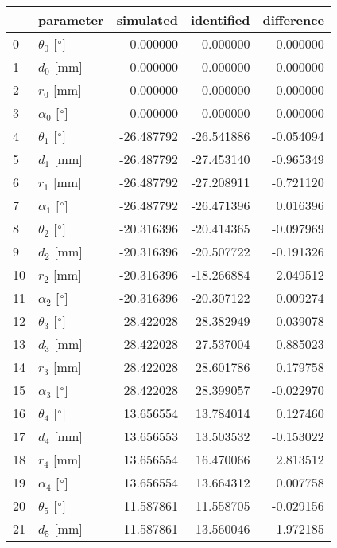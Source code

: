 \documentclass{standalone}%
\begin{document}
%
\normalsize%
\begin{tabular}{llrrr}
\toprule
{} &                 parameter &  simulated & identified & difference \\
\midrule
0  &  $\theta_{0}$ [$\degree$] &   0.000000 &   0.000000 &   0.000000 \\
1  &              $d_{0}$ [mm] &   0.000000 &   0.000000 &   0.000000 \\
2  &              $r_{0}$ [mm] &   0.000000 &   0.000000 &   0.000000 \\
3  &  $\alpha_{0}$ [$\degree$] &   0.000000 &   0.000000 &   0.000000 \\
4  &  $\theta_{1}$ [$\degree$] & -26.487792 & -26.541886 &  -0.054094 \\
5  &              $d_{1}$ [mm] & -26.487792 & -27.453140 &  -0.965349 \\
6  &              $r_{1}$ [mm] & -26.487792 & -27.208911 &  -0.721120 \\
7  &  $\alpha_{1}$ [$\degree$] & -26.487792 & -26.471396 &   0.016396 \\
8  &  $\theta_{2}$ [$\degree$] & -20.316396 & -20.414365 &  -0.097969 \\
9  &              $d_{2}$ [mm] & -20.316396 & -20.507722 &  -0.191326 \\
10 &              $r_{2}$ [mm] & -20.316396 & -18.266884 &   2.049512 \\
11 &  $\alpha_{2}$ [$\degree$] & -20.316396 & -20.307122 &   0.009274 \\
12 &  $\theta_{3}$ [$\degree$] &  28.422028 &  28.382949 &  -0.039078 \\
13 &              $d_{3}$ [mm] &  28.422028 &  27.537004 &  -0.885023 \\
14 &              $r_{3}$ [mm] &  28.422028 &  28.601786 &   0.179758 \\
15 &  $\alpha_{3}$ [$\degree$] &  28.422028 &  28.399057 &  -0.022970 \\
16 &  $\theta_{4}$ [$\degree$] &  13.656554 &  13.784014 &   0.127460 \\
17 &              $d_{4}$ [mm] &  13.656553 &  13.503532 &  -0.153022 \\
18 &              $r_{4}$ [mm] &  13.656554 &  16.470066 &   2.813512 \\
19 &  $\alpha_{4}$ [$\degree$] &  13.656554 &  13.664312 &   0.007758 \\
20 &  $\theta_{5}$ [$\degree$] &  11.587861 &  11.558705 &  -0.029156 \\
21 &              $d_{5}$ [mm] &  11.587861 &  13.560046 &   1.972185 \\

\end{tabular}
\end{document}
